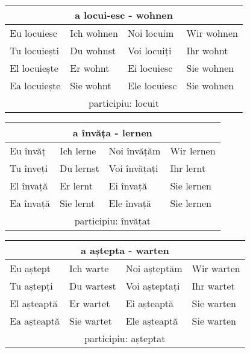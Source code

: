 \documentclass[11pt, oneside]{article}
\begin{document}
%
\begin{center}
  \begin{tabular}{ |p{3.25cm}|p{3.25cm}||p{3.25cm}|p{3.25cm}| }
      \hline
      \multicolumn{4}{|c|}{a locui-esc - wohnen} \\
      \hline
      \hline
      Eu locuiesc & Ich wohnen & Noi locuim & Wir wohnen\\
      \hline
      Tu locuiești & Du wohnst & Voi locuiți & Ihr wohnt\\
      \hline
      El locuiește & Er wohnt & Ei locuiesc & Sie wohnen\\ 
      Ea locuiește & Sie wohnt & Ele locuiesc & Sie wohnen\\
      \hline
      \multicolumn{4}{|c|}{participiu: locuit} \\
      \hline
     \end{tabular}
\end{center}
%
\begin{center}
  \begin{tabular}{ |p{3.25cm}|p{3.25cm}||p{3.25cm}|p{3.25cm}| }
      \hline
      \multicolumn{4}{|c|}{a învăța - lernen} \\
      \hline
      \hline
      Eu învăț & Ich lerne & Noi învățăm & Wir lernen\\
      \hline
      Tu înveți & Du lernst & Voi învățați & Ihr lernt\\
      \hline
      El învață & Er lernt & Ei învață & Sie lernen\\ 
      Ea învață & Sie lernt & Ele învață & Sie lernen\\
      \hline
      \multicolumn{4}{|c|}{participiu: învățat} \\
      \hline
     \end{tabular}
\end{center}
%
\begin{center}
  \begin{tabular}{ |p{3.25cm}|p{3.25cm}||p{3.25cm}|p{3.25cm}| }
      \hline
      \multicolumn{4}{|c|}{a aștepta - warten} \\
      \hline
      \hline
      Eu aștept & Ich warte & Noi așteptăm & Wir warten\\
      \hline
      Tu aștepți & Du wartest & Voi așteptați & Ihr wartet\\
      \hline
      El așteaptă & Er wartet & Ei așteaptă & Sie warten\\ 
      Ea așteaptă & Sie wartet & Ele așteaptă & Sie warten\\
      \hline
      \multicolumn{4}{|c|}{participiu: așteptat} \\
      \hline
     \end{tabular}
\end{center}
\end{document}
